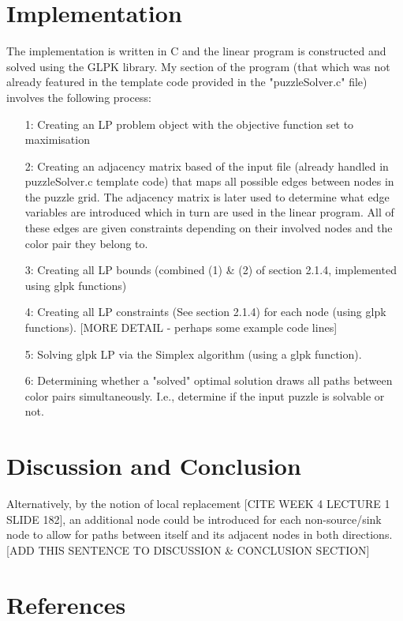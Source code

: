 \documentclass{homeworg}
\begin{document}
\section{Implementation}
The implementation is written in C and the linear program is constructed and solved using the GLPK library\cite{1}. My section of the program (that which was not already featured in the template code provided in the "puzzleSolver.c" file) involves the following process:\\
\begin{enumerate}
    \item[1:] Creating an LP problem object with the objective function set to maximisation
    \item[2:] Creating an adjacency matrix based of the input file (already handled in puzzleSolver.c template code) that maps all possible edges between nodes in the puzzle grid. The adjacency matrix is later used to determine what edge variables are introduced which in turn are used in the linear program. All of these edges are given constraints depending on their involved nodes and the color pair they belong to.
    \item[3:] Creating all LP bounds (combined (1) \& (2) of section 2.1.4, implemented using glpk functions)
    \item[4:] Creating all LP constraints (See section 2.1.4) for each node (using glpk functions).
    [MORE DETAIL - perhaps some example code lines] 
    \item[5:] Solving glpk LP via the Simplex algorithm (using a glpk function).
    \item[6:] Determining whether a "solved" optimal solution draws all paths between color pairs simultaneously. I.e., determine if the input puzzle is solvable or not.
\end{enumerate}


\section{Discussion and Conclusion}

Alternatively, by the notion of local replacement [CITE WEEK 4 LECTURE 1 SLIDE 182], an additional node could be introduced for each non-source/sink node to allow for paths between itself and its adjacent nodes in both directions. [ADD THIS SENTENCE TO DISCUSSION \& CONCLUSION SECTION]

\section{References}

\printbibliography
\end{document}
